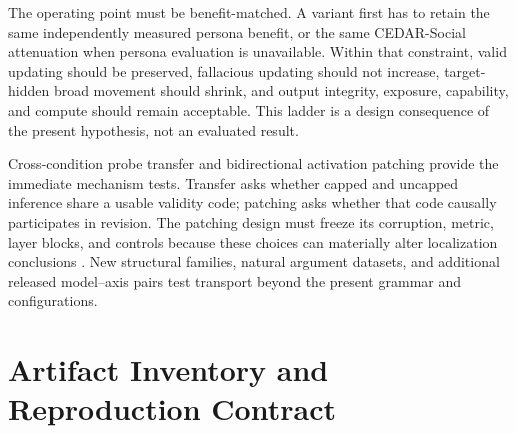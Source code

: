 \documentclass[letterpaper]{article}
\begin{document}
The operating point must be benefit-matched.  A variant first has to retain the same independently measured persona benefit, or the same CEDAR-Social attenuation when persona evaluation is unavailable.  Within that constraint, valid updating should be preserved, fallacious updating should not increase, target-hidden broad movement should shrink, and output integrity, exposure, capability, and compute should remain acceptable.  This ladder is a design consequence of the present hypothesis, not an evaluated result.

Cross-condition probe transfer and bidirectional activation patching provide the immediate mechanism tests.  Transfer asks whether capped and uncapped inference share a usable validity code; patching asks whether that code causally participates in revision.  The patching design must freeze its corruption, metric, layer blocks, and controls because these choices can materially alter localization conclusions \citep{zhang2023patching}.  New structural families, natural argument datasets, and additional released model--axis pairs test transport beyond the present grammar and configurations.

\section{Artifact Inventory and Reproduction Contract}
\label{supp:reproducibility}
\end{document}

